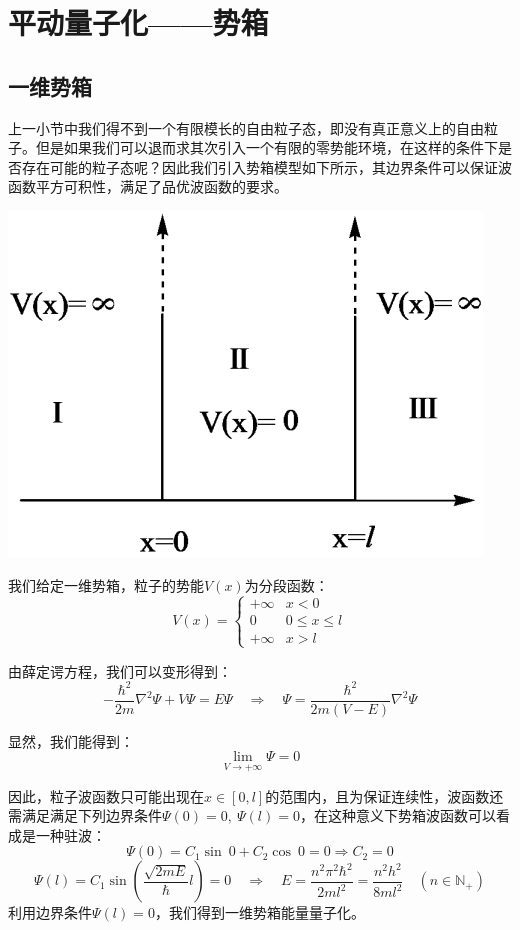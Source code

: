 \section{平动量子化——势箱}
\subsection{一维势箱}
上一小节中我们得不到一个有限模长的自由粒子态，即没有真正意义上的自由粒子。但是如果我们可以退而求其次引入一个有限的零势能环境，在这样的条件下是否存在可能的粒子态呢？因此我们引入势箱模型如下所示，其边界条件可以保证波函数平方可积性，满足了品优波函数的要求。

\begin{center}
    \includegraphics[scale=0.6]{fig/lzhx/微信图片_20211025092646.png}
\end{center}

我们给定一维势箱，粒子的势能$V(x)$为分段函数：
\[V(x)=\left\{
\begin{array}{rl}
+\infty & x<0\\
0 & 0 \leq x \leq l\\
+\infty & x>l
\end{array} \right.\]

由薛定谔方程，我们可以变形得到：
\[-\frac{\hbar^2}{2m}\nabla^2\varPsi+V\varPsi=E\varPsi \quad \Rightarrow \quad \varPsi=\frac{\hbar^2}{2m(V-E)}\nabla^2\varPsi\]

显然，我们能得到：
\[\lim_{V \rightarrow +\infty}\varPsi=0\]

因此，粒子波函数只可能出现在$x \in [0,l]$的范围内，且为保证连续性，波函数还需满足满足下列边界条件$\varPsi(0)=0, \ \varPsi(l)=0$，在这种意义下势箱波函数可以看成是一种驻波：
\[\varPsi(0)=C_1\sin \ 0+C_2\cos \ 0=0 \Rightarrow C_2=0\]
\[\varPsi(l)=C_1\sin(\frac{\sqrt{2mE}}{\hbar}l)=0 \quad \Rightarrow \quad E=\frac{n^2 \pi^2 \hbar^2}{2ml^2}=\frac{n^2 h^2}{8ml^2} \quad (n\in\mathbb{N}_+)\]
利用边界条件$\varPsi(l)=0$，我们得到一维势箱能量量子化。

